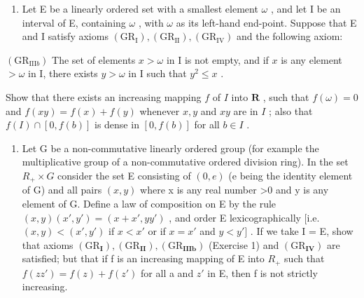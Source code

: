 \ExerciseSection

\begin{enumerate}
\def\labelenumi{\arabic{enumi})}
\tightlist
\item
  Let E be a linearly ordered set with a smallest element \(\omega\) , and let I be an interval of E, containing \(\omega\) , with \(\omega\) as its left-hand end-point. Suppose that E and I satisfy axioms \((\mathrm{GR}_{\mathrm{I}}), (\mathrm{GR}_{\mathrm{II}}), (\mathrm{GR}_{\mathrm{IV}})\) and the following axiom:
\end{enumerate}

\((\mathrm{GR}_{\mathrm{III}b})\) The set of elements \(x > \omega\) in I is not empty, and if \(x\) is any element \(> \omega\) in I, there exists \(y > \omega\) in I such that \(y^2 \leqslant x\) .

Show that there exists an increasing mapping \(f\) of \(I\) into \(\mathbf{R}\) , such that \(f(\omega) = 0\) and \(f(xy) = f(x) + f(y)\) whenever \(x, y\) and \(xy\) are in \(I\) ; also that \(f(I) \cap [0, f(b)]\) is dense in \([0, f(b)]\) for all \(b \in I\) .

\begin{enumerate}
\def\labelenumi{\arabic{enumi})}
\setcounter{enumi}{1}
\tightlist
\item
  Let G be a non-commutative linearly ordered group (for example the multiplicative group of a non-commutative ordered division ring). In the set \(R_{+} \times G\) consider the set E consisting of \((0, e)\) (e being the identity element of G) and all pairs \((x, y)\) where x is any real number \textgreater0 and y is any element of G. Define a law of composition on E by the rule \((x, y)(x', y') = (x + x', yy')\) , and order E lexicographically {[}i.e.~\((x, y) < (x', y')\) if \(x < x'\) or if \(x = x'\) and \(y < y']\) . If we take I = E, show that axioms \((\mathrm{GR}_{\mathbf{I}}), (\mathrm{GR}_{\mathbf{II}}), (\mathrm{GR}_{\mathbf{IIIb}})\) (Exercise 1) and \((\mathrm{GR}_{\mathbf{IV}})\) are satisfied; but that if f is an increasing mapping of E into \(R_{+}\) such that \(f(zz') = f(z) + f(z')\) for all a and \(z'\) in E, then f is not strictly increasing.
\end{enumerate}

\ExerciseSection

